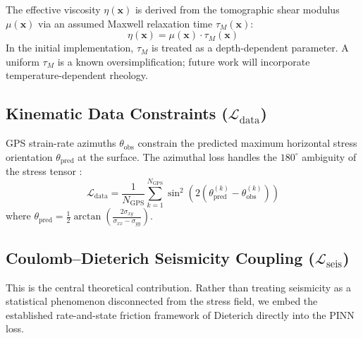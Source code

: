 \documentclass[11pt, a4paper]{article}
\begin{document}
The effective viscosity $\eta(\mathbf{x})$ is derived from the tomographic shear modulus $\mu(\mathbf{x})$ via an assumed Maxwell relaxation time $\tau_M(\mathbf{x})$:
\begin{equation}
    \eta(\mathbf{x}) = \mu(\mathbf{x}) \cdot \tau_M(\mathbf{x})
    \label{eq:viscosity}
\end{equation}
In the initial implementation, $\tau_M$ is treated as a depth-dependent parameter. A uniform $\tau_M$ is a known oversimplification; future work will incorporate temperature-dependent rheology.

\subsection{Kinematic Data Constraints ($\mathcal{L}_{\text{data}}$)}
GPS strain-rate azimuths $\theta_{\text{obs}}$ constrain the predicted maximum horizontal stress orientation $\theta_{\text{pred}}$ at the surface. The azimuthal loss handles the $180^\circ$ ambiguity of the stress tensor \cite{Heidbach2018}:
\begin{equation}
    \mathcal{L}_{\text{data}} = \frac{1}{N_{\text{GPS}}} \sum_{k=1}^{N_{\text{GPS}}} \sin^2\!\left(2\left(\theta_{\text{pred}}^{(k)} - \theta_{\text{obs}}^{(k)}\right)\right)
    \label{eq:data_loss}
\end{equation}
where $\theta_{\text{pred}} = \frac{1}{2}\arctan\!\left(\frac{2\sigma_{xy}}{\sigma_{xx} - \sigma_{yy}}\right)$.

\subsection{Coulomb--Dieterich Seismicity Coupling ($\mathcal{L}_{\text{seis}}$)}

This is the central theoretical contribution. Rather than treating seismicity as a statistical phenomenon disconnected from the stress field, we embed the established rate-and-state friction framework of Dieterich \cite{Dieterich1994} directly into the PINN loss.
\end{document}
